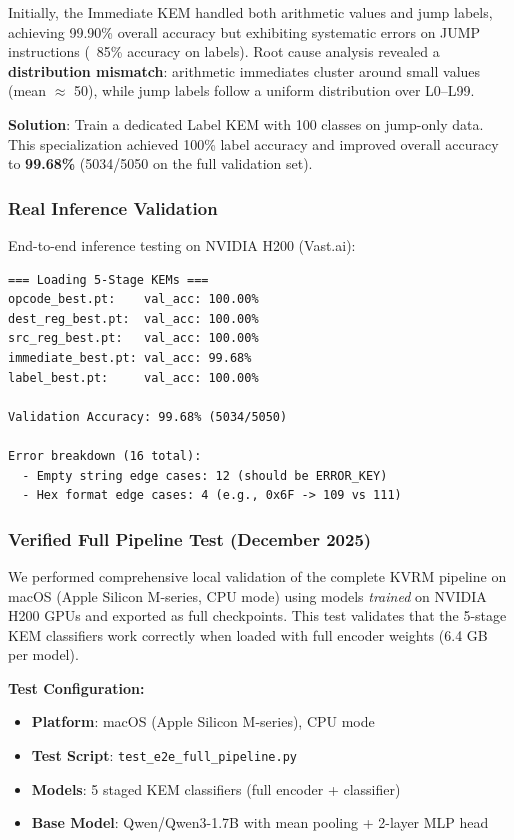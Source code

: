\documentclass[11pt,a4paper]{article}
\begin{document}
Initially, the Immediate KEM handled both arithmetic values and jump labels, achieving 99.90\% overall accuracy but exhibiting systematic errors on JUMP instructions (~85\% accuracy on labels). Root cause analysis revealed a \textbf{distribution mismatch}: arithmetic immediates cluster around small values (mean $\approx$ 50), while jump labels follow a uniform distribution over L0--L99.

\textbf{Solution}: Train a dedicated Label KEM with 100 classes on jump-only data. This specialization achieved 100\% label accuracy and improved overall accuracy to \textbf{99.68\%} (5034/5050 on the full validation set).

\subsubsection{Real Inference Validation}

End-to-end inference testing on NVIDIA H200 (Vast.ai):

\begin{lstlisting}
=== Loading 5-Stage KEMs ===
opcode_best.pt:    val_acc: 100.00%
dest_reg_best.pt:  val_acc: 100.00%
src_reg_best.pt:   val_acc: 100.00%
immediate_best.pt: val_acc: 99.68%
label_best.pt:     val_acc: 100.00%

Validation Accuracy: 99.68% (5034/5050)

Error breakdown (16 total):
  - Empty string edge cases: 12 (should be ERROR_KEY)
  - Hex format edge cases: 4 (e.g., 0x6F -> 109 vs 111)
\end{lstlisting}

\subsubsection{Verified Full Pipeline Test (December 2025)}

We performed comprehensive local validation of the complete KVRM pipeline on macOS (Apple Silicon M-series, CPU mode) using models \textit{trained} on NVIDIA H200 GPUs and exported as full checkpoints. This test validates that the 5-stage KEM classifiers work correctly when loaded with full encoder weights (6.4 GB per model).

\textbf{Test Configuration:}
\begin{itemize}
    \item \textbf{Platform}: macOS (Apple Silicon M-series), CPU mode
    \item \textbf{Test Script}: \texttt{test\_e2e\_full\_pipeline.py}
    \item \textbf{Models}: 5 staged KEM classifiers (full encoder + classifier)
    \item \textbf{Base Model}: Qwen/Qwen3-1.7B with mean pooling + 2-layer MLP head
\end{itemize}
\end{document}
